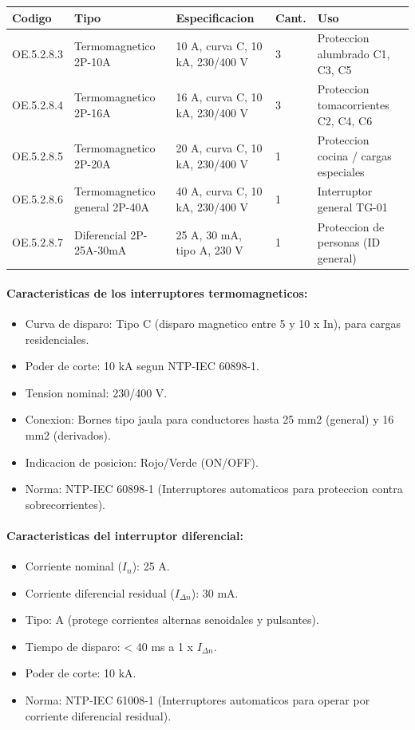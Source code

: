 \begin{longtable}{L{2.5cm} L{3.0cm} L{2.5cm} L{2.0cm} L{4.5cm}}
\toprule
\textbf{Codigo} & \textbf{Tipo} & \textbf{Especificacion} & \textbf{Cant.} & \textbf{Uso} \\
\midrule
OE.5.2.8.3 & Termomagnetico 2P-10A & 10 A, curva C, 10 kA, 230/400 V & 3 & Proteccion alumbrado C1, C3, C5 \\
OE.5.2.8.4 & Termomagnetico 2P-16A & 16 A, curva C, 10 kA, 230/400 V & 3 & Proteccion tomacorrientes C2, C4, C6 \\
OE.5.2.8.5 & Termomagnetico 2P-20A & 20 A, curva C, 10 kA, 230/400 V & 1 & Proteccion cocina / cargas especiales \\
OE.5.2.8.6 & Termomagnetico general 2P-40A & 40 A, curva C, 10 kA, 230/400 V & 1 & Interruptor general TG-01 \\
OE.5.2.8.7 & Diferencial 2P-25A-30mA & 25 A, 30 mA, tipo A, 230 V & 1 & Proteccion de personas (ID general) \\
\bottomrule
\end{longtable}

\paragraph{Caracteristicas de los interruptores termomagneticos:}
\begin{itemize}[nosep]
  \item Curva de disparo: Tipo C (disparo magnetico entre 5 y 10 x In), para cargas residenciales.
  \item Poder de corte: 10 kA segun NTP-IEC 60898-1.
  \item Tension nominal: 230/400 V.
  \item Conexion: Bornes tipo jaula para conductores hasta 25 mm2 (general) y 16 mm2 (derivados).
  \item Indicacion de posicion: Rojo/Verde (ON/OFF).
  \item Norma: NTP-IEC 60898-1 (Interruptores automaticos para proteccion contra sobrecorrientes).
\end{itemize}

\paragraph{Caracteristicas del interruptor diferencial:}
\begin{itemize}[nosep]
  \item Corriente nominal ($I_n$): 25 A.
  \item Corriente diferencial residual ($I_{\Delta n}$): 30 mA.
  \item Tipo: A (protege corrientes alternas senoidales y pulsantes).
  \item Tiempo de disparo: < 40 ms a 1 x $I_{\Delta n}$.
  \item Poder de corte: 10 kA.
  \item Norma: NTP-IEC 61008-1 (Interruptores automaticos para operar por corriente diferencial residual).
\end{itemize}

